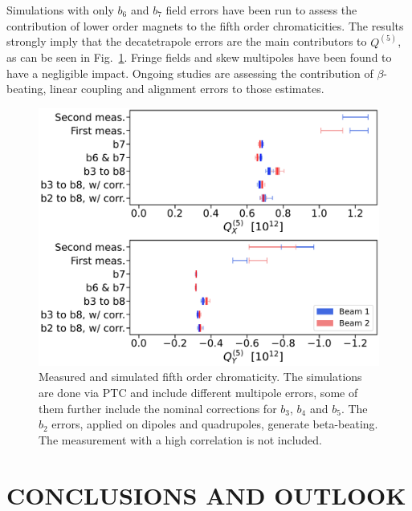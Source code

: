 Simulations with only $b_6$ and $b_7$ field errors have been run to assess the contribution of lower order magnets to the fifth order chromaticities. The results strongly imply that the decatetrapole errors are the main contributors to $Q^{(5)}$, as can be seen in Fig.~\ref{beam1_q5x_ptc}.
Fringe fields and skew multipoles have been found to have a negligible impact.
Ongoing studies are assessing the contribution of $\beta$-beating, linear coupling and alignment errors to those estimates.

\begin{figure}[tbh]
    \centering
    \includegraphics[width=1\columnwidth]{images/MOPL027_f4-1.pdf}
    \caption{Measured and simulated fifth order chromaticity. 
             The simulations are done via PTC and include different multipole errors, some of them further
             include the nominal corrections for $b_3$, $b_4$ and $b_5$.
             The $b_2$ errors, applied on dipoles and quadrupoles, generate beta-beating.
             The measurement with a high correlation is not included.}
    \label{beam1_q5x_ptc}
\end{figure}


\section{CONCLUSIONS AND OUTLOOK}


